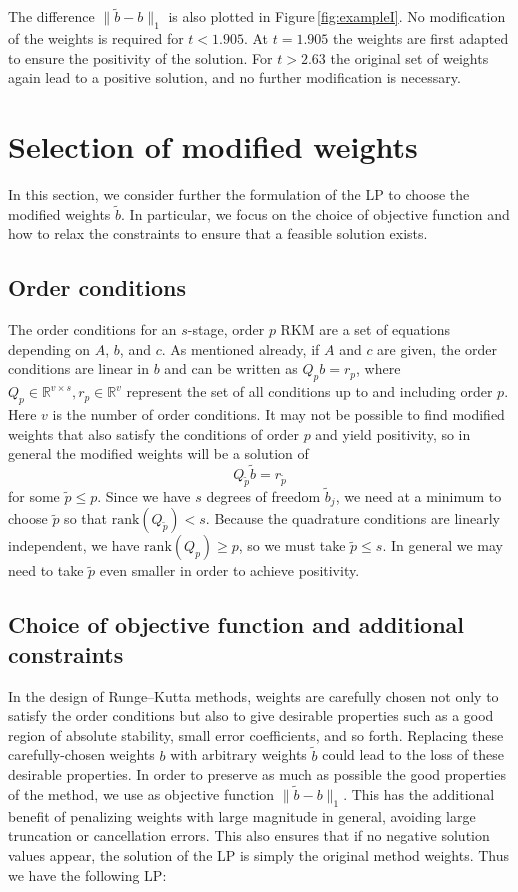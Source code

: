 \documentclass[a4paper]{article}
\numberwithin{equation}{section}
\theoremstyle{plain}
\theoremstyle{definition}
\numberwithin{theorem}{section}
\newcommand{\1}{\mathbbm{1}}
\newcommand{\bt}{\tilde{b}}
\newcommand{\pt}{{\tilde{p}}}
\begin{document}
The difference $\|\bt-b\|_1$ is also plotted in Figure\,\ref{fig:exampleI}.
No modification of the weights is required for $t<1.905$. At $t=1.905$ the
weights are first adapted to ensure the positivity of the solution. For
$t>2.63$ the original set of weights again lead to a positive solution,
and no further modification is necessary.


\section{Selection of modified weights}\label{sec:LP}

In this section, we consider further the formulation of the LP to choose
the modified weights $\bt$.  In particular, we focus on the choice
of objective function and how to relax the constraints to ensure that
a feasible solution exists.


\subsection{Order conditions}\label{sec:OrderCond}

The order conditions for an $s$-stage, order $p$ RKM are a set of equations depending on $A$, $b$, and
$c$.  As mentioned already, if $A$ and $c$ are given, the order conditions are
linear in $b$ and can be written as $Q_p b = r_p$, where
$Q_p\in{\mathbb R}^{v\times s}, r_p\in{\mathbb R}^v$ represent the set of all conditions up to
and including order $p$. Here $v$ is the number of order conditions. It may not be possible to find modified weights
that also satisfy the conditions of order $p$ and yield positivity, so
in general the modified weights will be a solution of
$$
  Q_\pt \bt = r_\pt
$$
for some $\pt \le p$.   Since we have $s$ degrees of freedom $\bt_j$,  we need
at a minimum to choose $\pt$ so that $\mathrm{rank}(Q_\pt) < s$.
Because the quadrature conditions are linearly independent, we have $\mathrm{rank}(Q_p)\ge p$,
so we must take $\pt \le s$.  In general we may need to take $\pt$ even smaller
in order to achieve positivity.


\subsection{Choice of objective function and additional constraints}
In the design of Runge--Kutta methods, weights are carefully chosen
not only to satisfy the order conditions but also
to give desirable properties such as a good region of absolute
stability, small error coefficients, and so forth.
Replacing these carefully-chosen weights $b$ with arbitrary weights
$\bt$ could lead to the loss of these desirable properties.
In order to preserve as much as possible the good properties of the method, we use as
objective function $\|\bt - b\|_1$.  This has the additional benefit
of penalizing weights with large magnitude in general, avoiding
large truncation or cancellation errors.  This also ensures that if
no negative solution values appear, the solution of the LP is
simply the original method weights.  Thus we have the following LP:
\end{document}
